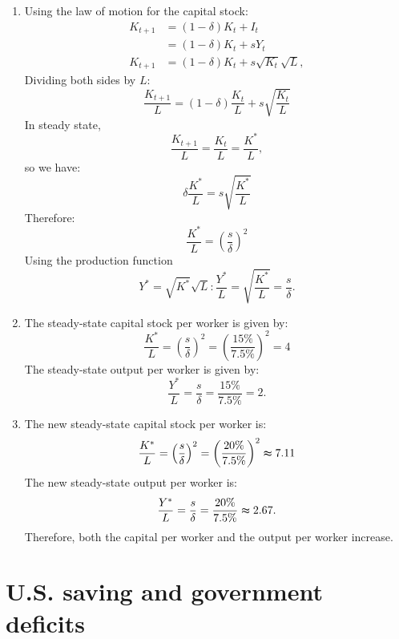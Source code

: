 \documentclass[]{book}
\theoremstyle{definition}
\theoremstyle{definition}
\theoremstyle{definition}
\theoremstyle{remark}
\begin{document}
\begin{enumerate}
\def\labelenumi{\arabic{enumi}.}
\item
  Using the law of motion for the capital stock: \[\begin{aligned}
  K_{t+1}&=(1-\delta)K_{t}+I_{t}\\
  &=(1-\delta)K_{t}+sY_{t}\\
  K_{t+1}&=(1-\delta)K_{t}+s\sqrt{K_{t}}\sqrt{L},
  \end{aligned}\] Dividing both sides by \(L\):
  \[\frac{K_{t+1}}{L}=(1-\delta)\frac{K_{t}}{L}+s\sqrt{\frac{K_{t}}{L}}\]
  In steady state,
  \[\frac{K_{t+1}}{L}=\frac{K_{t}}{L}=\frac{K^{*}}{L},\] so we have:
  \[\delta\frac{K^{*}}{L}=s\sqrt{\frac{K^{*}}{L}}\] Therefore:
  \[\frac{K^{*}}{L}=\left(\frac{s}{\delta}\right)^{2}\] Using the
  production function
  \[Y^{*}=\sqrt{K^{*}}\sqrt{L}:\frac{Y^{*}}{L}=\sqrt{\frac{K^{*}}{L}}=\frac{s}{\delta}.\]
\item
  The steady-state capital stock per worker is given by:
  \[\frac{K^{*}}{L}=\left(\frac{s}{\delta}\right)^{2}=\left(\frac{15\%}{7.5\%}\right)^{2}=4\]
  The steady-state output per worker is given by:
  \[\frac{Y^{*}}{L}=\frac{s}{\delta}=\frac{15\%}{7.5\%}=2.\]
\item
  The new steady-state capital stock per worker is:
  \[\frac{K^{*}}{L}=\left(\frac{s}{\delta}\right)^{2}=\left(\frac{20\%}{7.5\%}\right)^{2}\thickapprox7.11\]
  The new steady-state output per worker is:
  \[\frac{Y^{*}}{L}=\frac{s}{\delta}=\frac{20\%}{7.5\%}\thickapprox2.67.\]
  Therefore, both the capital per worker and the output per worker
  increase.
\end{enumerate}

\section{U.S. saving and government
deficits}\label{u.s.-saving-and-government-deficits-1}
\end{document}
